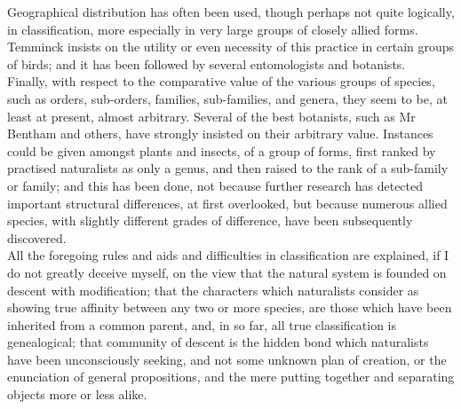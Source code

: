 \indent Geographical distribution has often been used, though perhaps not quite logically, in classification, more especially in very large groups of closely allied forms. Temminck insists on the utility or even necessity of this practice in certain groups of birds; and it has been followed by several entomologists and botanists.~\\
\indent Finally, with respect to the comparative value of the various groups of species, such as orders, sub-orders, families, sub-families, and genera, they seem to be, at least at present, almost arbitrary. Several of the best botanists, such as Mr Bentham and others, have strongly insisted on their arbitrary value. Instances could be given amongst plants and insects, of a group of forms, first ranked by practised naturalists as only a genus, and then raised to the rank of a sub-family or family; and this has been done, not because further research has detected important structural differences, at first overlooked, but because numerous allied species, with slightly different grades of difference, have been subsequently discovered.~\\
\indent All the foregoing rules and aids and difficulties in classification are explained, if I do not greatly deceive myself, on the view that the natural system is founded on descent with modification; that the characters which naturalists consider as showing true affinity between any two or more species, are those which have been inherited from a common parent, and, in so far, all true classification is genealogical; that community of descent is the hidden bond which naturalists have been unconsciously seeking, and not some unknown plan of creation, or the enunciation of general propositions, and the mere putting together and separating objects more or less alike.~\\
